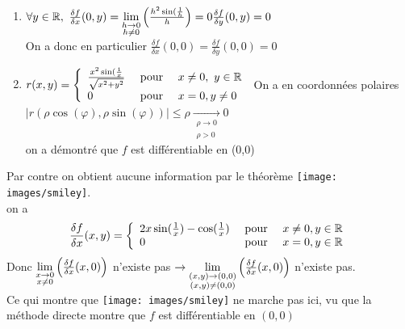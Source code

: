 \documentclass[12pt,a4paper]{article}
\begin{document}
\begin{enumerate}
	\item 	$\forall y \in \mathbb{R},\ \frac{\delta f}{\delta x}(0,y) = \lim\limits_{\substack{h\to 0 \\ h\neq 0}}\left(\frac{h^2\sin(\frac{1}{h}}{h}\right) = 0\\
	\frac{\delta f}{\delta	y} (0,y) = 0$\\
	On a donc en particulier $\frac{\delta f}{\delta x}(0,0) = \frac{\delta f}{\delta y}(0,0) = 0$
	\item 	$r(x,y) = \left\{\begin{array}{lll}
	\frac{x^2\sin(\frac{1}{x}}{\sqrt{x^2+y^2}} & \mbox{ pour } & x\neq 0,\ y\in \mathbb{R}\\
	0 & \mbox{ pour } & x=0, y\neq 0
	\end{array}\right.$
	On a en coordonnées polaires $|r(\rho \cos(\varphi),\rho \sin(\varphi))| \leq \rho \underset{\substack{\rho \to 0 \\ \rho > 0}}{\rightarrow} 0$\\
			on a démontré que $f$ est différentiable en (0,0)
\end{enumerate}
Par contre on obtient aucune information par le théorème \texttt{[image: images/smiley]}.\\
on a 
\begin{equation*}
	\frac{\delta f}{\delta x}(x,y) = \left\{\begin{array}{lll}
		2x\sin(\frac{1}{x}) - \cos(\frac{1}{x}) & \mbox{ pour } & x\neq 0, y\in \mathbb{R}\\
		0 & \mbox{ pour } & x=0, y\in \mathbb{R}
	\end{array}\right.
\end{equation*}
Donc $\lim\limits_{\substack{x\to 0 \\ x\neq 0}}\left(\frac{\delta f}{\delta x}(x,0)\right)$ n'existe pas $\to \lim\limits_{\substack{(x,y) \to (0,0) \\ (x,y) \neq (0,0)}}\left(\frac{\delta f}{\delta x}(x,0)\right)$ n'existe pas.\\
Ce qui montre que \texttt{[image: images/smiley]} ne marche pas ici, vu que la méthode directe montre que $f$ est différentiable en $(0,0)$
\end{document}
